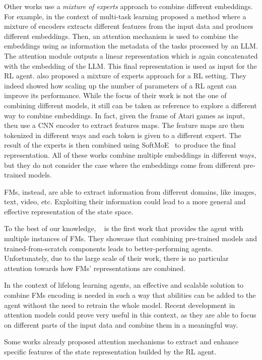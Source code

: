 Other works use a \textit{mixture of experts} approach to combine different embeddings.
For example, in the context of multi-task learning \citet{sodhani2021multi} proposed a method where a mixture of encoders extracts different features from the input data and produces different embeddings.
Then, an attention mechanism is used to combine the embeddings using as information the metadata of the tasks processed by an LLM\@.
The attention module outputs a linear representation which is again concatenated with the embedding of the LLM\@.
This final representation is used as input for the RL agent.
\citet{obando2024mixtures} also proposed a mixture of experts approach for a RL setting.
They indeed showed how scaling up the number of parameters of a RL agent can improve its performance.
While the focus of their work is not the one of combining different models, it still can be taken as reference to explore a different way to combine embeddings.
In fact, given the frame of Atari games as input, theu use a CNN encoder to extract features maps.
The feature maps are then tokenized in different ways and each token is given to a different expert.
The result of the experts is then combined using SoftMoE~\citep{puigcerver2023sparse} to produce the final representation.
All of these works combine multiple embeddings in different ways, but they do not consider the case where the embeddings come from different pre-trained models.

FMs, instead, are able to extract information from different domains, like images, text, video, etc.
Exploiting their information could lead to a more general and effective representation of the state space.

To the best of our knowledge, ~\citet{sima2024} is the first work that provides the agent with multiple instances of FMs.
They showcase that combining pre-trained models and trained-from-scratch components leads to better-performing agents.
Unfortunately, due to the large scale of their work, there is no particular attention towards how FMs' representations are combined.

In the context of lifelong learning agents, an effective and scalable solution to combine FMs encoding is needed in such a way that abilities can be added to the agent without the need to retrain the whole model.
Recent development in attention models could prove very useful in this context, as they are able to focus on different parts of the input data and combine them in a meaningful way.

Some works already proposed attention mechanisms to extract and enhance specific features of the state representation builded by the RL agent.


